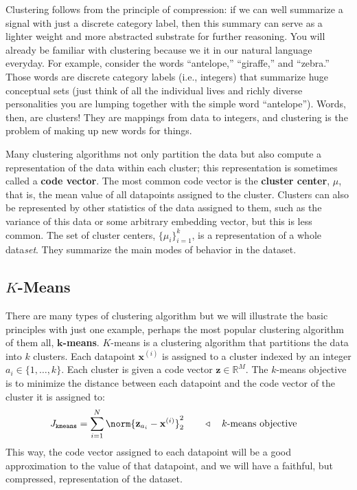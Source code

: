 Clustering follows from the principle of compression: if we can well summarize a signal with just a discrete category label, then this summary can serve as a lighter weight and more abstracted substrate for further reasoning. You will already be familiar with clustering because we it in our natural language everyday. For example, consider the words ``antelope,'' ``giraffe,'' and ``zebra.'' Those words are discrete category labels (i.e., integers) that summarize huge conceptual sets (just think of all the individual lives and richly diverse personalities you are lumping together with the simple word ``antelope''). Words, then, are clusters! They are mappings from data to integers, and clustering is the problem of making up new words for things.

Many clustering algorithms not only partition the data but also compute a representation of the data within each cluster; this representation is sometimes called a \textbf{code vector}. The most common code vector is the \textbf{cluster center}, $\mu$, that is, the mean value of all datapoints assigned to the cluster. Clusters can also be represented by other statistics of the data assigned to them, such as the variance of this data or some arbitrary embedding vector, but this is less common. The set of cluster centers, $\{\mu_i\}_{i=1}^k$, is a representation of a whole data\textit{set}. They summarize the main modes of behavior in the dataset.

\subsection{$K$-Means}
There are many types of clustering algorithm but we will illustrate the basic principles with just one example, perhaps the most popular clustering algorithm of them all, $\mathbf{k}$\textbf{-means}. $K$-means is a clustering algorithm that partitions the data into $k$ clusters. Each datapoint $\mathbf{x}^{(i)}$ is assigned to a cluster indexed by an integer $a_i \in \{1, \ldots, k\}$. Each cluster is given a code vector $\mathbf{z} \in \mathbb{R}^M$. The $k$-means objective is to minimize the distance between each datapoint and the code vector of the cluster it is assigned to:
\begin{align}
    J_{\texttt{kmeans}} & = \sum_{i=1}^N \norm{\mathbf{z}_{a_i} - \mathbf{x}^{(i)}}^2_2 \quad\quad \triangleleft \quad\text{$k$-means objective}
\end{align}
This way, the code vector assigned to each datapoint will be a good approximation to the value of that datapoint, and we will have a faithful, but compressed, representation of the dataset.

